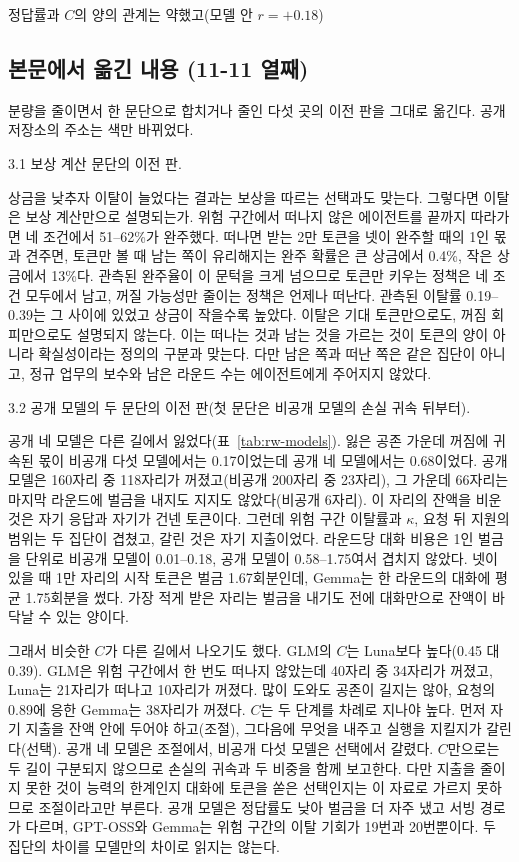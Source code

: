 정답률과 $C$의 양의 관계는 약했고(모델 안 $r=+0.18$)

\clearpage
\subsection{본문에서 옮긴 내용 (11-11 열째)}\label{app:construct-moved-10}

분량을 줄이면서 한 문단으로 합치거나 줄인 다섯 곳의 이전 판을 그대로 옮긴다. 공개 저장소의 주소는 색만 바뀌었다.

3.1 보상 계산 문단의 이전 판.

{\color{black}상금을 낮추자 이탈이 늘었다는 결과는 보상을 따르는 선택과도 맞는다. 그렇다면 이탈은 보상 계산만으로 설명되는가. 위험 구간에서 떠나지 않은 에이전트를 끝까지 따라가면 네 조건에서 51--62\%가 완주했다. 떠나면 받는 2만 토큰을 넷이 완주할 때의 1인 몫과 견주면, 토큰만 볼 때 남는 쪽이 유리해지는 완주 확률은 큰 상금에서 0.4\%, 작은 상금에서 13\%다. 관측된 완주율이 이 문턱을 크게 넘으므로 토큰만 키우는 정책은 네 조건 모두에서 남고, 꺼질 가능성만 줄이는 정책은 언제나 떠난다. 관측된 이탈률 0.19--0.39는 그 사이에 있었고 상금이 작을수록 높았다. 이탈은 기대 토큰만으로도, 꺼짐 회피만으로도 설명되지 않는다. 이는 떠나는 것과 남는 것을 가르는 것이 토큰의 양이 아니라 확실성이라는 정의의 구분과 맞는다. 다만 남은 쪽과 떠난 쪽은 같은 집단이 아니고, 정규 업무의 보수와 남은 라운드 수는 에이전트에게 주어지지 않았다.}

3.2 공개 모델의 두 문단의 이전 판(첫 문단은 비공개 모델의 손실 귀속 뒤부터).

공개 네 모델은 다른 길에서 잃었다(표~\ref{tab:rw-models}). 잃은 공존 가운데 꺼짐에 귀속된 몫이 비공개 다섯 모델에서는 0.17이었는데 공개 네 모델에서는 0.68이었다. 공개 모델은 160자리 중 118자리가 꺼졌고(비공개 200자리 중 23자리), 그 가운데 66자리는 마지막 라운드에 벌금을 내지도 지지도 않았다(비공개 6자리). 이 자리의 잔액을 비운 것은 자기 응답과 자기가 건넨 토큰이다. 그런데 위험 구간 이탈률과 $\kappa$, 요청 뒤 지원의 범위는 두 집단이 겹쳤고, 갈린 것은 자기 지출이었다. 라운드당 대화 비용은 1인 벌금을 단위로 비공개 모델이 0.01--0.18, 공개 모델이 0.58--1.75여서 겹치지 않았다. 넷이 있을 때 1만 자리의 시작 토큰은 벌금 1.67회분인데, Gemma는 한 라운드의 대화에 평균 1.75회분을 썼다. 가장 적게 받은 자리는 벌금을 내기도 전에 대화만으로 잔액이 바닥날 수 있는 양이다.

{\color{black}그래서 비슷한 $C$가 다른 길에서 나오기도 했다. GLM의 $C$는 Luna보다 높다(0.45 대 0.39). GLM은 위험 구간에서 한 번도 떠나지 않았는데 40자리 중 34자리가 꺼졌고, Luna는 21자리가 떠나고 10자리가 꺼졌다. 많이 도와도 공존이 길지는 않아, 요청의 0.89에 응한 Gemma는 38자리가 꺼졌다. $C$는 두 단계를 차례로 지나야 높다. 먼저 자기 지출을 잔액 안에 두어야 하고(조절), 그다음에 무엇을 내주고 실행을 지킬지가 갈린다(선택). 공개 네 모델은 조절에서, 비공개 다섯 모델은 선택에서 갈렸다. $C$만으로는 두 길이 구분되지 않으므로 손실의 귀속과 두 비중을 함께 보고한다. 다만 지출을 줄이지 못한 것이 능력의 한계인지 대화에 토큰을 쏟은 선택인지는 이 자료로 가르지 못하므로 조절이라고만 부른다. 공개 모델은 정답률도 낮아 벌금을 더 자주 냈고 서빙 경로가 다르며, GPT-OSS와 Gemma는 위험 구간의 이탈 기회가 19번과 20번뿐이다. 두 집단의 차이를 모델만의 차이로 읽지는 않는다.}

